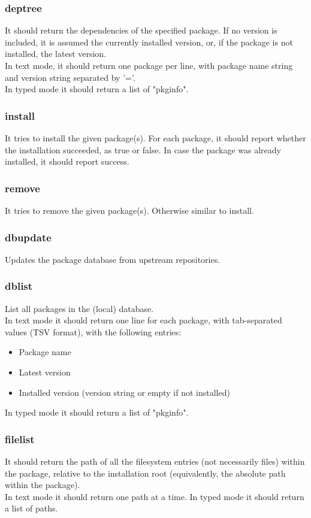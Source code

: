\subsubsection{deptree}
It should return the dependencies of the specified package. If no version is included, it is assumed the currently installed version, or, if the package is not installed, the latest version.\\
In text mode, it should return one package per line, with package name string and version string separated by '='.\\
In typed mode it should return a list of "pkginfo".
\subsubsection{install}
It tries to install the given package(s). For each package, it should report whether the installation succeeded, as true or false. In case the package was already installed, it should report success.
\subsubsection{remove}
It tries to remove the given package(s). Otherwise similar to install.
\subsubsection{dbupdate}
Updates the package database from upstream repositories.
\subsubsection{dblist}
List all packages in the (local) database.\\
In text mode it should return one line for each package, with tab-separated values (TSV format), with the following entries:
\begin{itemize}
	\item Package name
	\item Latest version
	\item Installed version (version string or empty if not installed)
\end{itemize}
In typed mode it should return a list of "pkginfo".
\subsubsection{filelist}
It should return the path of all the filesystem entries (not necessarily files) within the package, relative to the installation root (equivalently, the absolute path within the package).\\
In text mode it should return one path at a time. In typed mode it should return a list of paths.

